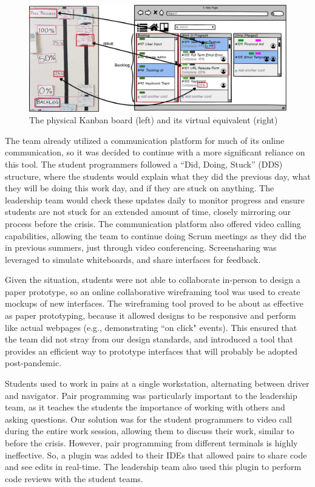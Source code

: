 \begin{figure}[h]
 \centering
 \includegraphics[width=\linewidth]{newTrellomockup2.png}
 \caption{The physical Kanban board (left) and its virtual equivalent (right)}
 \label{fig:digitalkanban}
\end{figure}

The team already utilized a communication platform for much of its online communication, so it was decided to continue with a more significant reliance on this tool. The student programmers followed a ``Did, Doing, Stuck'' (DDS) structure, where the students would explain what they did the previous day, what they will be doing this work day, and if they are stuck on anything. The leadership team would check these updates daily to monitor progress and ensure students are not stuck for an extended amount of time, closely mirroring our process before the crisis. The communication platform also offered video calling capabilities, allowing the team to continue doing Scrum meetings as they did the in previous summers, just through video conferencing. Screensharing was leveraged to simulate whiteboards, and share interfaces for feedback.

Given the situation, students were not able to collaborate in-person to design a paper prototype, so an online collaborative wireframing tool was used to create mockups of new interfaces. The wireframing tool proved to be about as effective as paper prototyping, because it allowed designs to be responsive and perform like actual webpages (e.g., demonstrating ``on click" events). This ensured that the team did not stray from our design standards, and introduced a tool that provides an efficient way to prototype interfaces that will probably be adopted post-pandemic.

Students used to work in pairs at a single workstation, alternating between driver and navigator. Pair programming was particularly important to the leadership team, as it teaches the students the importance of working with others and asking questions. Our solution was for the student programmers to video call during the entire work session, allowing them to discuss their work, similar to before the crisis. However, pair programming from different terminals is highly ineffective. So, a plugin was added to their IDEs that allowed pairs to share code and see edits in real-time. The leadership team also used this plugin to perform code reviews with the student teams.


